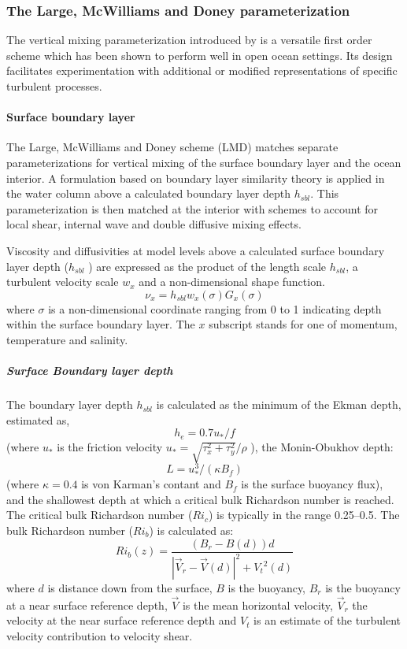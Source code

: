 \subsubsection{The Large, McWilliams and Doney parameterization}
\label{sec:origLMD}

The vertical mixing parameterization introduced by
\citet{Large94} is a versatile first order scheme which has
been shown to perform well in open ocean settings.  Its design
facilitates experimentation with additional or modified representations
of specific turbulent processes.

\paragraph{Surface boundary layer}
The Large, McWilliams and Doney scheme (LMD)
matches separate parameterizations for vertical mixing
of the surface boundary layer and the ocean interior.  A formulation
based on boundary layer similarity theory is applied in the water
column above a calculated boundary layer depth $h_{sbl}$.  This
parameterization is then matched at the interior with schemes to
account for local shear, internal wave and double diffusive mixing
effects.  

Viscosity and diffusivities at model levels above a calculated
surface boundary layer depth ($h_{sbl}$ ) are expressed as the product
of the length scale $h_{sbl}$, a turbulent velocity scale $w_x$ and a
non-dimensional shape function.
\begin{equation}
\nu_x = h_{sbl} w_x(\sigma)G_x(\sigma)
\end{equation}
where $\sigma$ is a non-dimensional coordinate ranging from 0 to 1
indicating depth within the surface boundary layer. The $x$ subscript
stands for one of momentum, temperature and salinity.

\subparagraph{Surface Boundary layer depth}
The boundary layer depth $h_{sbl}$ is calculated as the minimum of the
Ekman depth, estimated as,
\begin{equation}
h_e=0.7u_*/f
\end{equation}
(where $u_*$ is the friction velocity $u_*=\sqrt{\tau_x^2+\tau_y^2}/\rho$ ),
 the Monin-Obukhov depth:
\begin{equation}
L=u_*^3/(\kappa B_f)
\end{equation}
(where $\kappa = 0.4$ is von Karman's contant and $B_f$ is the surface
buoyancy flux), and the shallowest depth at which a critical bulk
Richardson number is reached. The critical bulk Richardson number
($Ri_c$) is typically in the range 0.25--0.5. The bulk Richardson
number ($Ri_b$) is calculated as:
\begin{equation}
Ri_b(z)=\frac{(B_r-B(d))d}{|\vec{V}_r-\vec{V}(d)|^2+{V_t}^2(d)}
\end{equation}
where $d$ is distance down from the surface, $B$ is the buoyancy,
$B_r$ is the buoyancy at a near surface reference depth, $\vec{V}$ is
the mean horizontal velocity, $\vec{V}_r$ the velocity at the near
surface reference depth and $V_t$ is an estimate of the turbulent
velocity contribution to velocity shear.

